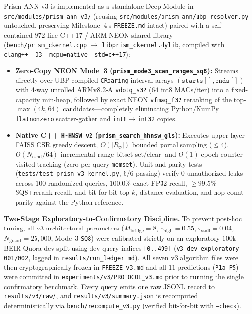 \documentclass[conference]{IEEEtran}
\begin{document}
Prism-ANN v3 is implemented as a standalone Deep Module in \texttt{src/modules/prism\_ann\_v3/} (reusing \texttt{src/modules/prism\_ann/ubp\_resolver.py} untouched, preserving Milestone~4's \texttt{FREEZE.md} intact) paired with a self-contained $972$-line C++17 / ARM NEON shared library (\texttt{bench/prism\_ckernel.cpp} $\to$ \texttt{libprism\_ckernel.dylib}, compiled with \texttt{clang++ -O3 -mcpu=native -std=c++17}):
\begin{itemize}
    \item \textbf{Zero-Copy NEON Mode~3 (\texttt{prism\_mode3\_scan\_ranges\_sq8}):} Streams directly over UBP-compiled \texttt{CRoaring} interval arrays $(\texttt{starts}[], \texttt{ends}[])$ with 4-way unrolled ARMv8.2-A \texttt{vdotq\_s32} ($64$ int8 MACs/iter) into a fixed-capacity min-heap, followed by exact NEON \texttt{vfmaq\_f32} reranking of the top-$\max(4k, 64)$ candidates---completely eliminating Python/NumPy \texttt{flatnonzero} scatter-gather and \texttt{int8}$\to$\texttt{int32} copies.
    \item \textbf{Native C++ \texttt{H-HNSW v2} (\texttt{prism\_search\_hhnsw\_gls}):} Executes upper-layer FAISS CSR greedy descent, $O(|R_\Phi|)$ bounded portal sampling ($\le 4$), $O(N_{\text{cand}}/64)$ incremental range bitset set/clear, and $O(1)$ epoch-counter visited tracking (zero per-query \texttt{memset}). Unit and parity tests (\texttt{tests/test\_prism\_v3\_kernel.py}, $6/6$ passing) verify $0$ unauthorized leaks across $100$ randomized queries, $100.0\%$ exact FP32 recall, $\ge 99.5\%$ SQ8+rerank recall, and bit-for-bit top-$k$, distance-evaluation, and hop-count parity against the Python reference.
\end{itemize}

\noindent\textbf{Two-Stage Exploratory-to-Confirmatory Discipline.}
To prevent post-hoc tuning, all v3 architectural parameters ($M_{\text{bridge}}=8$, $\tau_{\text{high}}=0.55$, $\tau_{\text{stall}}=0.04$, $N_{\text{guard}}=25{,}000$, Mode~3 \texttt{SQ8}) were calibrated strictly on an exploratory $100\text{k}$ BEIR Quora dev split using dev query indices \texttt{[0..499]} (\texttt{v3-dev-exploratory-001/002}, logged in \texttt{results/run\_ledger.md}). All seven v3 algorithm files were then cryptographically frozen in \texttt{FREEZE\_v3.md} and all $11$ predictions (\texttt{P1a}--\texttt{P5}) were committed in \texttt{experiments/v3/PROTOCOL\_v3.md} prior to running the single confirmatory benchmark. Every query emits one raw JSONL record to \texttt{results/v3/raw/}, and \texttt{results/v3/summary.json} is recomputed deterministically via \texttt{bench/recompute\_v3.py} (verified bit-for-bit with \texttt{--check}).
\end{document}
